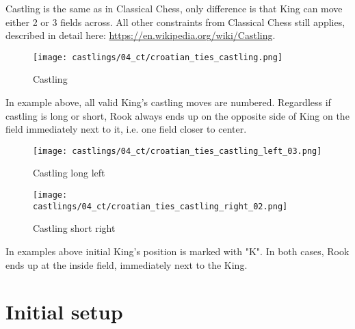 \vspace*{-0.3\baselineskip}
Castling is the same as in Classical Chess, only difference is that King can move either 2 or 3
fields across. All other constraints from Classical Chess still applies, described in detail here:
\href{https://en.wikipedia.org/wiki/Castling}{https://en.wikipedia.org/wiki/Castling}.

\vspace*{-0.3\baselineskip}
\noindent
\begin{figure}[!h]
\texttt{[image: castlings/04\_ct/croatian\_ties\_castling.png]}
\vspace*{-1.4\baselineskip}
\caption{Castling}
\label{fig:croatian_ties_castling}
\end{figure}

\vspace*{-0.3\baselineskip}
In example above, all valid King's castling moves are numbered. Regardless if castling is long or short,
Rook always ends up on the opposite side of King on the field immediately next to it, i.e. one field closer
to center.

\vspace*{-0.3\baselineskip}
\noindent
\begin{figure}[!h]
\texttt{[image: castlings/04\_ct/croatian\_ties\_castling\_left\_03.png]}
\vspace*{-1.4\baselineskip}
\caption{Castling long left}
\label{fig:croatian_ties_castling_left_03}
\end{figure}

\vspace*{-0.7\baselineskip}
\noindent
\begin{figure}[!h]
\texttt{[image: castlings/04\_ct/croatian\_ties\_castling\_right\_02.png]}
\vspace*{-1.4\baselineskip}
\caption{Castling short right}
\label{fig:croatian_ties_castling_right_02}
\end{figure}

\vspace*{-0.3\baselineskip}
In examples above initial King's position is marked with "K". In both cases, Rook ends up at the
inside field, immediately next to the King.

\clearpage %

\section*{Initial setup}
\label{sec:Croatian Ties/Initial setup}

